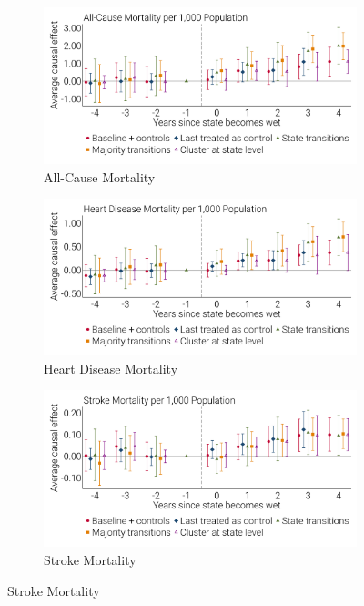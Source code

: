 \documentclass[12pt]{article}
\begin{document}
\newpage 
{}
\begin{landscape}
\begin{figure}[!ht]
    \caption[Event Studies By Cause of Death)]{Event Studies By Cause of Death}
    \centering
    \begin{subfigure}{0.47\linewidth}
        \centering 
        \caption[All-Cause Mortality]{All-Cause Mortality}        
        \includegraphics[width=1.0\linewidth]{../analysis/output/appendix/figure_a3a_es_robust_controls_deaths.png}
    \end{subfigure}
    \begin{subfigure}{0.47\linewidth}
        \centering 
        \caption[Heart Disease Mortality]{Heart Disease Mortality}        
        \includegraphics[width=1.0\linewidth]{../analysis/output/appendix/figure_a3b_es_robust_controls_heart.png}
    \end{subfigure}
    \begin{subfigure}{0.47\linewidth}
        \centering 
        \caption[Stroke Mortality]{Stroke Mortality}        
        \includegraphics[width=1.0\linewidth]{../analysis/output/appendix/figure_a3c_es_robust_controls_stroke.png}

\end{subfigure}
\end{figure}
\end{landscape}
\end{document}
